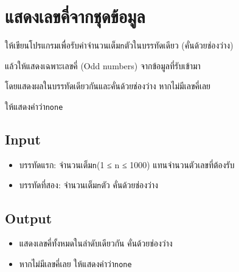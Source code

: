 \documentclass{article}
\begin{document}
\section*{แสดงเลขคี่จากชุดข้อมูล}

ให้เขียนโปรแกรมเพื่อรับค่าจำนวนเต็ม\texttt{n}ตัวในบรรทัดเดียว (คั่นด้วยช่องว่าง)



แล้วให้แสดงเฉพาะเลขคี่ (Odd numbers) จากข้อมูลที่รับเข้ามา



โดยแสดงผลในบรรทัดเดียวกันและคั่นด้วยช่องว่าง หากไม่มีเลขคี่เลย

ให้แสดงคำว่า\texttt{none}\\



\subsection*{Input}
\begin{itemize}

\item

  บรรทัดแรก: จำนวนเต็ม\texttt{n}(1 ≤ n ≤ 1000) แทนจำนวนตัวเลขที่ต้องรับ

\item

  บรรทัดที่สอง: จำนวนเต็ม\texttt{n}ตัว คั่นด้วยช่องว่าง

\end{itemize}



\subsection*{Output}
\begin{itemize}

\item

  แสดงเลขคี่ทั้งหมดในลำดับเดียวกัน คั่นด้วยช่องว่าง

\item

  หากไม่มีเลขคี่เลย ให้แสดงคำว่า\texttt{none}

\end{itemize}
\end{document}
